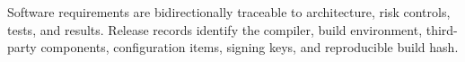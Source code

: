 Software requirements are bidirectionally traceable to architecture, risk controls, tests, and results. Release records identify the compiler, build environment, third-party components, configuration items, signing keys, and reproducible build hash.

